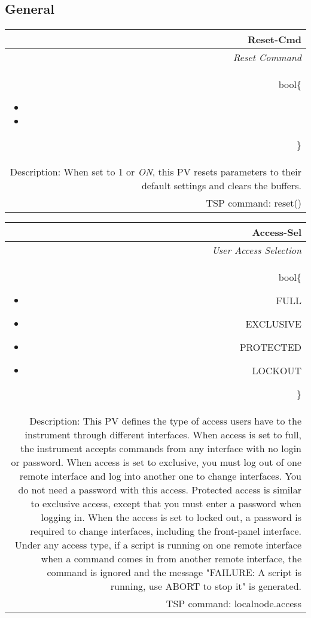 \documentclass[openany]{article}
\begin{document}
	\subsection{General}\label{pvgroup:general}

		\paragraph{} %

		\begin{tabular}{N}
			\hline
			\bfseries Reset-Cmd\label{pv:reset-cmd} \\ \hline
			\emph{Reset Command} \\
			bool\{\begin{itemize}[noitemsep]
				\small
				\item[] 
				\item[] 
			\end{itemize}\} \\
			Description: When set to 1 or \emph{ON}, this PV resets parameters to their default settings and clears the buffers. \\
			TSP command: reset()
		\end{tabular}

		\begin{tabular}{N}
			\hline
			\bfseries Access-Sel\label{pv:access-sel} \\ \hline
			\emph{User Access Selection} \\
			bool\{\begin{itemize}[noitemsep]
				\small
				\item[] FULL
				\item[] EXCLUSIVE
				\item[] PROTECTED
				\item[] LOCKOUT
			\end{itemize}\} \\
			Description: This PV defines the type of access users have to the instrument through different interfaces. When access is set to full, the instrument accepts commands from any interface with no login or password. When access is set to exclusive, you must log out of one remote interface and log into another one to change interfaces. You do not need a password with this access. Protected access is similar to exclusive access, except that you must enter a password when logging in. When the access is set to locked out, a password is required to change interfaces, including the front-panel interface. Under any access type, if a script is running on one remote interface when a command comes in from another remote interface, the command is ignored and the message "FAILURE: A script is running, use ABORT to stop it" is generated. \\
			TSP command: localnode.access
		\end{tabular}
\end{document}
